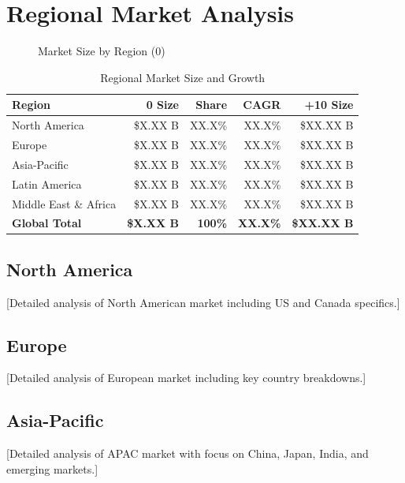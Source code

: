 \documentclass[11pt,letterpaper]{report}
\newcommand{\baseyear}{0}
\newcommand{\horizonyear}{\the\numexpr\baseyear+10\relax}    %
\begin{document}
\section{Regional Market Analysis}


\begin{figure}[htbp]
\centering
\caption{Market Size by Region (\baseyear{})}
\label{fig:regional_breakdown}
\end{figure}

\begin{table}[htbp]
\centering
\caption{Regional Market Size and Growth}
\begin{tabular}{@{}lrrrr@{}}
\toprule
\textbf{Region} & \textbf{\baseyear{} Size} & \textbf{Share} & \textbf{CAGR} & \textbf{\horizonyear{} Size} \\
\midrule
North America & \$X.XX B & XX.X\% & XX.X\% & \$XX.XX B \\
\rowcolor{tablealt} Europe & \$X.XX B & XX.X\% & XX.X\% & \$XX.XX B \\
Asia-Pacific & \$X.XX B & XX.X\% & XX.X\% & \$XX.XX B \\
\rowcolor{tablealt} Latin America & \$X.XX B & XX.X\% & XX.X\% & \$XX.XX B \\
Middle East \& Africa & \$X.XX B & XX.X\% & XX.X\% & \$XX.XX B \\
\midrule
\textbf{Global Total} & \textbf{\$X.XX B} & \textbf{100\%} & \textbf{XX.X\%} & \textbf{\$XX.XX B} \\
\bottomrule
\end{tabular}
\label{tab:regional_market}
\end{table}

\subsection{North America}
[Detailed analysis of North American market including US and Canada specifics.]

\subsection{Europe}
[Detailed analysis of European market including key country breakdowns.]

\subsection{Asia-Pacific}
[Detailed analysis of APAC market with focus on China, Japan, India, and emerging markets.]
\end{document}
